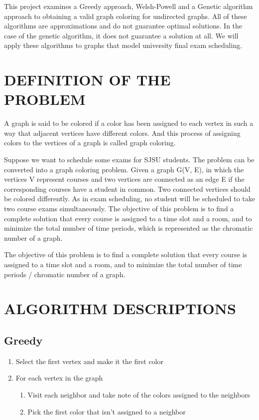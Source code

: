 \documentclass[12]{article}
\begin{document}
This project examines a Greedy approach, Welsh-Powell and a Genetic algorithm approach to obtaining a valid graph coloring for undirected graphs. All of these algorithms are approximations and do not guarantee optimal solutions. In the case of the genetic algorithm, it does not guarantee a solution at all. We will apply these algorithms to graphs that model university final exam scheduling.
\section{DEFINITION OF THE PROBLEM}
A graph is said to be colored if a color has been assigned to each vertex in such a way that adjacent vertices have different colors. And this process of assigning colors to the vertices of a graph is called graph coloring.

Suppose we want to schedule some exams for SJSU students. The problem can be converted into a graph coloring problem. Given a graph G(V, E), in which the vertices V represent courses and two vertices are connected as an edge E if the corresponding courses have a student in common. Two connected vertices should be colored differently. As in exam scheduling, no student will be scheduled to take two course exams simultaneously. The objective of this problem is to find a complete solution that every course is assigned to a time slot and a room, and to minimize the total number of time periods, which is represented as the chromatic number of a graph.

The objective of this problem is to find a complete solution that every course is assigned to a time slot and a room, and to minimize the total number of time periods / chromatic number of a graph.
\section{ALGORITHM DESCRIPTIONS}
\subsection*{Greedy}
\begin{enumerate}
	\item Select the first vertex and make it the first color
	\item For each vertex in the graph
	\begin{enumerate}
		\item Visit each neighbor and take note of the colors assigned to the neighbors
		\item Pick the first color that isn't assigned to a neighbor
	\end{enumerate}
\end{enumerate}
\end{document}
